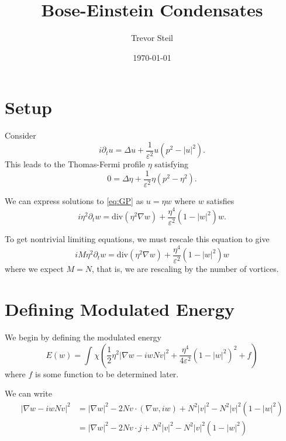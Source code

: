\documentclass[a4paper]{article}
\title{Bose-Einstein Condensates }
\date{\today}
\author{Trevor Steil}
\renewcommand{\div}{\mathrm{div}}
\newlength{\horizspace}
\newlength{\smallspace}
\begin{document}
\maketitle

\setlength{\horizspace}{1.5cm}
\setlength{\smallspace}{.7cm}

\section{Setup}
Consider
\begin{equation} \label{eq:GP}
  i \partial_t u = \Delta u + \frac{1}{\varepsilon^2} u (p^2 - |u|^2).
\end{equation}
This leads to the Thomas-Fermi profile $\eta$ satisfying
\begin{equation} \label{eq:Thomas-Fermi}
  0 = \Delta \eta + \frac{1}{\varepsilon^2} \eta (p^2 - \eta^2).
\end{equation}

We can express solutions to \eqref{eq:GP} as $u = \eta w$ where $w$ satisfies
\begin{equation} \label{eq:PDE}
  i \eta^2 \partial_t w = \div ( \eta^2 \nabla w ) + \frac{\eta^4}{\varepsilon^2} ( 1 - |w|^2 ) w.
\end{equation}

To get nontrivial limiting equations, we must rescale this equation to give
\begin{equation}
  i M \eta^2 \partial_t w = \div ( \eta^2 \nabla w ) + \frac{\eta^4}{\varepsilon^2}(1 - |w|^2)w
  \label{eq:rescaled_PDE}
\end{equation}
where we expect $M = N$, that is, we are rescaling by the number of vortices.

\section{Defining Modulated Energy}

We begin by defining the modulated energy
\begin{equation}
  E(w) = \int_{}^{} \chi ( \frac{1}{2} \eta^2 | \nabla w - i w N v|^2 + \frac{\eta^4}{4 \varepsilon^2} (1 - |w|^2)^2 + f )
  \label{eq:modulated_energy1}
\end{equation}
where $f$ is some function to be determined later.

We can write
\begin{align*}
  | \nabla w - i w N v |^2 &= |\nabla w|^2 - 2 N v \cdot ( \nabla w, iw ) + N^2 |v|^2 - N^2 |v|^2 (1-|w|^2) \\
  &= | \nabla w |^2 - 2N v \cdot j + N^2 |v|^2 - N^2 |v|^2 ( 1 -|w|^2 )
\end{align*}
\end{document}
